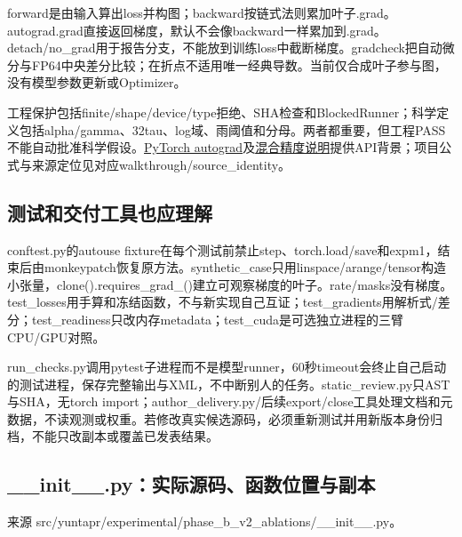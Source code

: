 \documentclass[UTF8,fontset=fandol,10pt]{ctexart}
\begin{document}
forward是由输入算出loss并构图；backward按链式法则累加叶子.grad。autograd.grad直接返回梯度，默认不会像backward一样累加到.grad。detach/\allowbreak{}no\_\allowbreak{}grad用于报告分支，不能放到训练loss中截断梯度。gradcheck把自动微分与FP64中央差分比较；在折点不适用唯一经典导数。当前仅合成叶子参与图，没有模型参数更新或Optimizer。

工程保护包括finite/\allowbreak{}shape/\allowbreak{}device/\allowbreak{}type拒绝、SHA检查和BlockedRunner；科学定义包括alpha/\allowbreak{}gamma、32tau、log域、雨阈值和分母。两者都重要，但工程PASS不能自动批准科学假设。\href{https://docs.pytorch.org/docs/2.7/notes/autograd.html}{PyTorch autograd}及\href{https://docs.pytorch.org/docs/2.7/amp.html}{混合精度说明}提供API背景；项目公式与来源定位见对应walkthrough/\allowbreak{}source\_\allowbreak{}identity。

\subsection{测试和交付工具也应理解}

conftest.py的autouse fixture在每个测试前禁止step、torch.load/\allowbreak{}save和expm1，结束后由monkeypatch恢复原方法。synthetic\_\allowbreak{}case只用linspace/\allowbreak{}arange/\allowbreak{}tensor构造小张量，clone().requires\_\allowbreak{}grad\_\allowbreak{}()建立可观察梯度的叶子。rate/\allowbreak{}masks没有梯度。test\_\allowbreak{}losses用手算和冻结函数，不与新实现自己互证；test\_\allowbreak{}gradients用解析式/\allowbreak{}差分；test\_\allowbreak{}readiness只改内存metadata；test\_\allowbreak{}cuda是可选独立进程的三臂CPU/\allowbreak{}GPU对照。

run\_\allowbreak{}checks.py调用pytest子进程而不是模型runner，60秒timeout会终止自己启动的测试进程，保存完整输出与XML，不中断别人的任务。static\_\allowbreak{}review.py只AST与SHA，无torch import；author\_\allowbreak{}delivery.py/\allowbreak{}后续export/\allowbreak{}close工具处理文档和元数据，不读观测或权重。若修改真实候选源码，必须重新测试并用新版本身份归档，不能只改副本或覆盖已发表结果。

\subsection{\_\allowbreak{}\_\allowbreak{}init\_\allowbreak{}\_\allowbreak{}.py：实际源码、函数位置与副本}

来源 src/\allowbreak{}yuntapr/\allowbreak{}experimental/\allowbreak{}phase\_\allowbreak{}b\_\allowbreak{}v2\_\allowbreak{}ablations/\allowbreak{}\_\allowbreak{}\_\allowbreak{}init\_\allowbreak{}\_\allowbreak{}.py。
\end{document}
